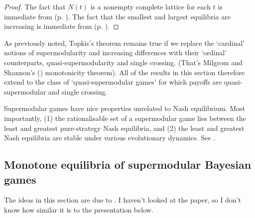 \documentclass[11pt,letterpaper,reqno,oneside]{article}
\begin{document}
\begin{proof}
	The fact that $N(t)$ is a nonempty complete lattice for each $t$ is immediate from  (p. \pageref{proposition:Zhou_Nash}). The fact that the smallest and largest equilibria are increasing is immediate from  (p. \pageref{proposition:Tarski_Topkis}).
\end{proof}

As previously noted, Topkis's theorem remains true if we replace the `cardinal' notions of supermodularity and increasing differences with their `ordinal' counterparts, quasi-supermodularity and single crossing. (That's Milgrom and Shannon's (\citeyear{MilgromShannon1994}) monotonicity theorem). All of the results in this section therefore extend to the class of `quasi-supermodular games' for which payoffs are quasi-supermodular and single crossing.


Supermodular games have nice properties unrelated to Nash equilibrium. Most importantly, (1) the rationalisable set of a supermodular game lies between the least and greatest pure-strategy Nash equilibria, and (2) the least and greatest Nash equilibria are stable under various evolutionary dynamics. See \textcite{MilgromRoberts1990ecta}.



\subsection{Monotone equilibria of supermodular Bayesian games}
\label{sec:supermodular:supermodular_Bayesian_games}

The ideas in this section are due to \textcite{VanzandtVives2007}. I haven't looked at the paper, so I don't know how similar it is to the presentation below.
\end{document}
